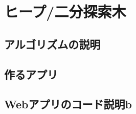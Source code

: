 \chapter{ヒープ/二分探索木}
\label{chap:chap04-heap}

\section{アルゴリズムの説明}
\label{sec:4-1}

\section{作るアプリ}
\label{sec:4-2}

\section{Webアプリのコード説明b}
\label{sec:4-3}
